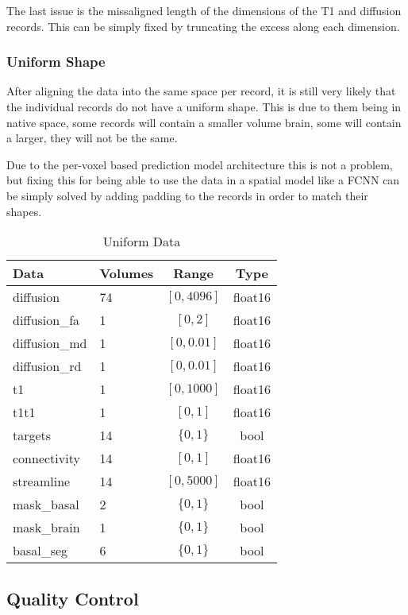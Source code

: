 The last issue is the missaligned length of the dimensions of the T1 and diffusion records. This can be simply fixed by truncating the excess along each dimension.

\subsubsection{Uniform Shape}
After aligning the data into the same space per record, it is still very likely that the individual records do not have a uniform shape. This is due to them being in native space, some records will contain a smaller volume brain, some will contain a larger, they will not be the same.\par
Due to the per-voxel based prediction model architecture this is not a problem, but fixing this for being able to use the data in a spatial model like a \ac{FCNN} can be simply solved by adding padding to the records in order to match their shapes.
\begin{table}[H]
\centering
\begin{tabular}{|l|l|c|c|}
\hline
\textbf{Data} & \textbf{Volumes} & \textbf{Range} & \textbf{Type} \\ \hline
diffusion & 74 & $[0,4096]$ & float16 \\ \hline
diffusion\_fa & 1 & $[0,2]$ & float16 \\ \hline
diffusion\_md & 1 & $[0,0.01]$ & float16 \\ \hline
diffusion\_rd & 1 & $[0,0.01]$ & float16 \\ \hline
t1 & 1 & $[0,1000]$ & float16 \\ \hline
t1t1 & 1 & $[0,1]$ & float16 \\ \hline
targets & 14 & $\{0,1\}$ & bool \\ \hline
connectivity & 14 & $[0,1]$ & float16 \\ \hline
streamline & 14 & $[0,5000]$ & float16 \\ \hline
mask\_basal & 2 & $\{0,1\}$ & bool \\ \hline
mask\_brain & 1 & $\{0,1\}$ & bool \\ \hline
basal\_seg & 6 & $\{0,1\}$ & bool \\ \hline
\end{tabular}
\caption{Uniform Data}
\label{tab:datas2}
\end{table}

\subsection{Quality Control}

